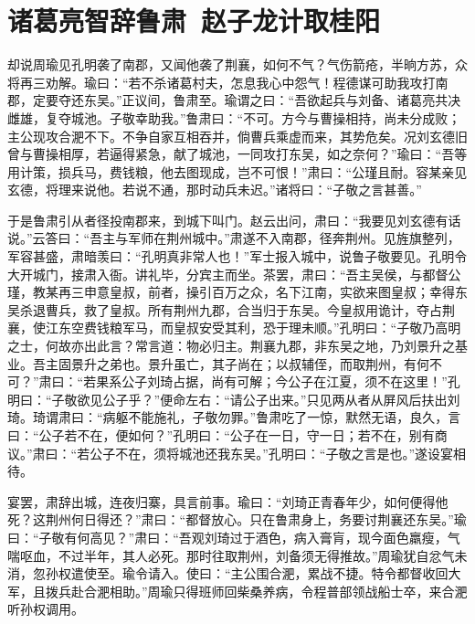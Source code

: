 \chapter{诸葛亮智辞鲁肃~赵子龙计取桂阳}

却说周瑜见孔明袭了南郡，又闻他袭了荆襄，如何不气？气伤箭疮，半晌方苏，众将再三劝解。瑜曰：“若不杀诸葛村夫，怎息我心中怨气！程德谋可助我攻打南郡，定要夺还东吴。”正议间，鲁肃至。瑜谓之曰：“吾欲起兵与刘备、诸葛亮共决雌雄，复夺城池。子敬幸助我。”鲁肃曰：“不可。方今与曹操相持，尚未分成败；主公现攻合淝不下。不争自家互相吞并，倘曹兵乘虚而来，其势危矣。况刘玄德旧曾与曹操相厚，若逼得紧急，献了城池，一同攻打东吴，如之奈何？”瑜曰：“吾等用计策，损兵马，费钱粮，他去图现成，岂不可恨！”肃曰：“公瑾且耐。容某亲见玄德，将理来说他。若说不通，那时动兵未迟。”诸将曰：“子敬之言甚善。”

于是鲁肃引从者径投南郡来，到城下叫门。赵云出问，肃曰：“我要见刘玄德有话说。”云答曰：“吾主与军师在荆州城中。”肃遂不入南郡，径奔荆州。见旌旗整列，军容甚盛，肃暗羡曰：“孔明真非常人也！”军士报入城中，说鲁子敬要见。孔明令大开城门，接肃入衙。讲礼毕，分宾主而坐。茶罢，肃曰：“吾主吴侯，与都督公瑾，教某再三申意皇叔，前者，操引百万之众，名下江南，实欲来图皇叔；幸得东吴杀退曹兵，救了皇叔。所有荆州九郡，合当归于东吴。今皇叔用诡计，夺占荆襄，使江东空费钱粮军马，而皇叔安受其利，恐于理未顺。”孔明曰：“子敬乃高明之士，何故亦出此言？常言道：物必归主。荆襄九郡，非东吴之地，乃刘景升之基业。吾主固景升之弟也。景升虽亡，其子尚在；以叔辅侄，而取荆州，有何不可？”肃曰：“若果系公子刘琦占据，尚有可解；今公子在江夏，须不在这里！”孔明曰：“子敬欲见公子乎？”便命左右：“请公子出来。”只见两从者从屏风后扶出刘琦。琦谓肃曰：“病躯不能施礼，子敬勿罪。”鲁肃吃了一惊，默然无语，良久，言曰：“公子若不在，便如何？”孔明曰：“公子在一日，守一日；若不在，别有商议。”肃曰：“若公子不在，须将城池还我东吴。”孔明曰：“子敬之言是也。”遂设宴相待。

宴罢，肃辞出城，连夜归寨，具言前事。瑜曰：“刘琦正青春年少，如何便得他死？这荆州何日得还？”肃曰：“都督放心。只在鲁肃身上，务要讨荆襄还东吴。”瑜曰：“子敬有何高见？”肃曰：“吾观刘琦过于酒色，病入膏肓，现今面色羸瘦，气喘呕血，不过半年，其人必死。那时往取荆州，刘备须无得推故。”周瑜犹自忿气未消，忽孙权遣使至。瑜令请入。使曰：“主公围合淝，累战不捷。特令都督收回大军，且拨兵赴合淝相助。”周瑜只得班师回柴桑养病，令程普部领战船士卒，来合淝听孙权调用。

